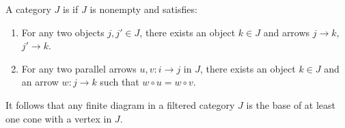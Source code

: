 A category $J$ is  if $J$ is nonempty and satisfies:
\begin{enumerate}
\item For any two objects $j, j' \in J$, there exists an object $k \in J$ and arrows $j \to k$, $j' \to k$.
\item For any two parallel arrows $u, v : i \to j$ in $J$, there exists an object $k \in J$ and an arrow $w : j \to k$ such that $w \circ u = w \circ v$.
\end{enumerate}
It follows that any finite diagram in a filtered category $J$ is the base of at least one cone with a vertex in $J$.
